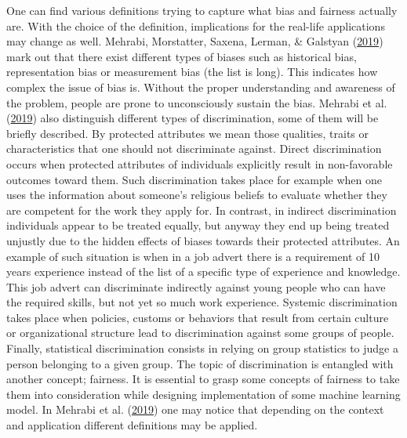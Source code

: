 \documentclass[12pt,]{book}
\begin{document}
One can find various definitions trying to capture what bias and
fairness actually are. With the choice of the definition, implications
for the real-life applications may change as well. Mehrabi, Morstatter,
Saxena, Lerman, \& Galstyan
(\protect\hyperlink{ref-Mehrabi2019Survey}{2019}) mark out that there
exist different types of biases such as historical bias, representation
bias or measurement bias (the list is long). This indicates how complex
the issue of bias is. Without the proper understanding and awareness of
the problem, people are prone to unconsciously sustain the bias. Mehrabi
et al. (\protect\hyperlink{ref-Mehrabi2019Survey}{2019}) also
distinguish different types of discrimination, some of them will be
briefly described. By protected attributes we mean those qualities,
traits or characteristics that one should not discriminate against.
Direct discrimination occurs when protected attributes of individuals
explicitly result in non-favorable outcomes toward them. Such
discrimination takes place for example when one uses the information
about someone's religious beliefs to evaluate whether they are competent
for the work they apply for. In contrast, in indirect discrimination
individuals appear to be treated equally, but anyway they end up being
treated unjustly due to the hidden effects of biases towards their
protected attributes. An example of such situation is when in a job
advert there is a requirement of 10 years experience instead of the list
of a specific type of experience and knowledge. This job advert can
discriminate indirectly against young people who can have the required
skills, but not yet so much work experience. Systemic discrimination
takes place when policies, customs or behaviors that result from certain
culture or organizational structure lead to discrimination against some
groups of people. Finally, statistical discrimination consists in
relying on group statistics to judge a person belonging to a given
group. The topic of discrimination is entangled with another concept;
fairness. It is essential to grasp some concepts of fairness to take
them into consideration while designing implementation of some machine
learning model. In Mehrabi et al.
(\protect\hyperlink{ref-Mehrabi2019Survey}{2019}) one may notice that
depending on the context and application different definitions may be
applied.
\end{document}
